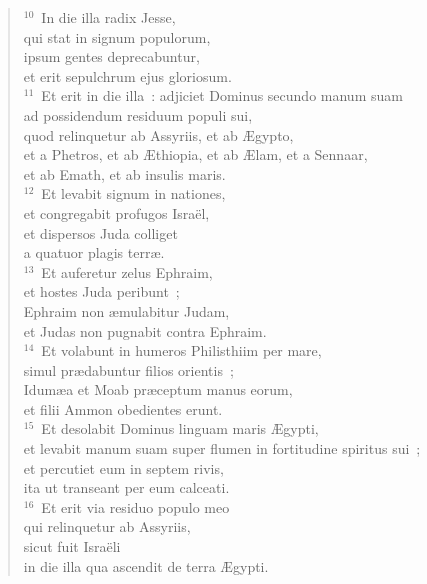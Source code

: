 \begin{verse}${}^{10}$~In die illa radix Jesse,\\ qui stat in signum populorum,\\ ipsum gentes deprecabuntur,\\ et erit sepulchrum ejus gloriosum.\\
${}^{11}$~Et erit in die illa~: adjiciet Dominus secundo manum suam\\ ad possidendum residuum populi sui,\\ quod relinquetur ab Assyriis, et ab \AE gypto,\\ et a Phetros, et ab \AE thiopia, et ab \AE lam, et a Sennaar,\\ et ab Emath, et ab insulis maris.\\
${}^{12}$~Et levabit signum in nationes,\\ et congregabit profugos Isra\"el,\\ et dispersos Juda colliget\\ a quatuor plagis terr\ae .\\
${}^{13}$~Et auferetur zelus Ephraim,\\ et hostes Juda peribunt~;\\ Ephraim non \ae mulabitur Judam,\\ et Judas non pugnabit contra Ephraim.\\
${}^{14}$~Et volabunt in humeros Philisthiim per mare,\\ simul pr\ae dabuntur filios orientis~;\\ Idum\ae a et Moab pr\ae ceptum manus eorum,\\ et filii Ammon obedientes erunt.\\
${}^{15}$~Et desolabit Dominus linguam maris \AE gypti,\\ et levabit manum suam super flumen in fortitudine spiritus sui~;\\ et percutiet eum in septem rivis,\\ ita ut transeant per eum calceati.\\
${}^{16}$~Et erit via residuo populo meo\\ qui relinquetur ab Assyriis,\\ sicut fuit Isra\"eli\\ in die illa qua ascendit de terra \AE gypti.\end{verse}


